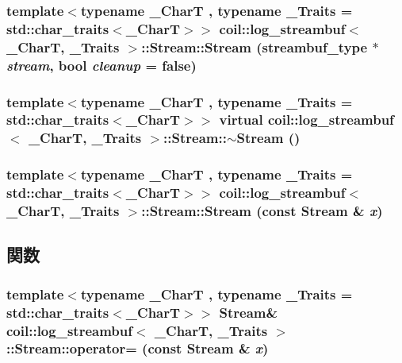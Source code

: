 \subsubsection[{Stream}]{\setlength{\rightskip}{0pt plus 5cm}template$<$typename \_\-CharT , typename \_\-Traits  = std::char\_\-traits$<$\_\-CharT$>$$>$ {\bf coil::log\_\-streambuf}$<$ \_\-CharT, \_\-Traits $>$::Stream::Stream ({\bf streambuf\_\-type} $\ast$ {\em stream}, \/  bool {\em cleanup} = {\ttfamily false})\hspace{0.3cm}{\ttfamily  [inline]}}\label{structcoil_1_1log__streambuf_1_1Stream_a8e445a1569a7c6aadb43f4fbf2562a20}
\subsubsection[{$\sim$Stream}]{\setlength{\rightskip}{0pt plus 5cm}template$<$typename \_\-CharT , typename \_\-Traits  = std::char\_\-traits$<$\_\-CharT$>$$>$ virtual {\bf coil::log\_\-streambuf}$<$ \_\-CharT, \_\-Traits $>$::Stream::$\sim$Stream ()\hspace{0.3cm}{\ttfamily  [inline, virtual]}}\label{structcoil_1_1log__streambuf_1_1Stream_a19ab5a6862a1dc2e20da102b744d5737}
\subsubsection[{Stream}]{\setlength{\rightskip}{0pt plus 5cm}template$<$typename \_\-CharT , typename \_\-Traits  = std::char\_\-traits$<$\_\-CharT$>$$>$ {\bf coil::log\_\-streambuf}$<$ \_\-CharT, \_\-Traits $>$::Stream::Stream (const {\bf Stream} \& {\em x})\hspace{0.3cm}{\ttfamily  [inline]}}\label{structcoil_1_1log__streambuf_1_1Stream_a494575e16ffcad41ed6741f139bfef9a}


\subsection{関数}
\subsubsection[{operator=}]{\setlength{\rightskip}{0pt plus 5cm}template$<$typename \_\-CharT , typename \_\-Traits  = std::char\_\-traits$<$\_\-CharT$>$$>$ {\bf Stream}\& {\bf coil::log\_\-streambuf}$<$ \_\-CharT, \_\-Traits $>$::Stream::operator= (const {\bf Stream} \& {\em x})\hspace{0.3cm}{\ttfamily  [inline]}}\label{structcoil_1_1log__streambuf_1_1Stream_a7fb53fc7cd206f99c8e251663e307323}


